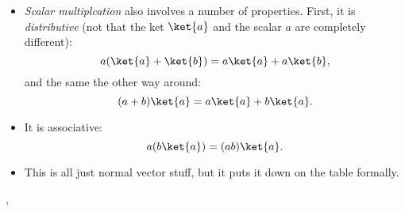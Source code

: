 \begin{itemize}
    \item \textit{Scalar multiplcation} also involves a number of properties. First, it is \textit{distributive} (not that the ket $\ket{a}$ and the scalar $a$ are completely different):
        \begin{equation*}
            a(\ket{a} + \ket{b}) = a\ket{a} + a\ket{b},
        \end{equation*}
        and the same the other way around:
        \begin{equation*}
            (a+b)\ket{a} = a\ket{a} + b\ket{a}.
        \end{equation*}
    \item It is associative:
        \begin{equation*}
            a(b\ket{a}) = (ab)\ket{a}.
        \end{equation*}
    \item This is all just normal vector stuff, but it puts it down on the table formally.
\end{itemize}

\sep

